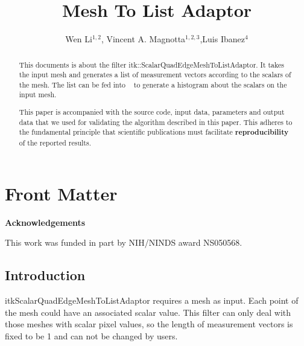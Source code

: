 \documentclass{InsightArticle}
\title{Mesh To List Adaptor}
\author{Wen Li$^{1,2}$, Vincent A. Magnotta$^{1,2,3}$,Luis Ibanez$^{4}$}
\makeatletter
\newcommand\ackname{Acknowledgements}
\newenvironment{acknowledgements}{%
      \titlepage
      \null\vfil
      \@beginparpenalty\@lowpenalty
      \begin{center}%
        \bfseries \ackname
        \@endparpenalty\@M
      \end{center}}%
     {\par\vfil\null\endtitlepage}
\newenvironment{acknowledgements}{%
      \if@twocolumn
        \section*{\abstractname}%
      \else
        \small
        \begin{center}%
          {\bfseries \ackname\vspace{-.5em}\vspace{\z@}}%
        \end{center}%
        \quotation
      \fi}
      {\if@twocolumn\else\endquotation\fi}
\newcommand{\IJhandlerIDnumber}{3203}
\makeatother
\begin{document}
%
% 
\IJhandlefooter{\IJhandlerIDnumber}


\ifpdf
\else
\fi


\maketitle


\ifhtml
\chapter*{Front Matter\label{front}}
\fi


\begin{abstract}
 
This documents is about the filter itk::ScalarQuadEdgeMeshToListAdaptor. It takes 
the input mesh and generates a list of measurement vectors according to 
the scalars of the mesh. The list can be fed into 
~\cite{ITKSoftwareGuide,ITKSoftwareGuideSecondEdition}
 to generate a histogram about the scalars on the input mesh.

This paper is accompanied with the source code, input data, parameters and
output data that we used for validating the algorithm described in this paper.
This adheres to the fundamental principle that scientific publications must
facilitate \textbf{reproducibility} of the reported results.
\end{abstract}

\begin{acknowledgements}
This work was funded in part by NIH/NINDS award NS050568.
\end{acknowledgements}

\tableofcontents

\section{Introduction}
itkScalarQuadEdgeMeshToListAdaptor requires a mesh as input. Each point of the mesh
could have an associated scalar value. This filter can only deal with those meshes with
scalar pixel values, so the length of measurement vectors is fixed to be 1 and can not
be changed by users.
\end{document}
